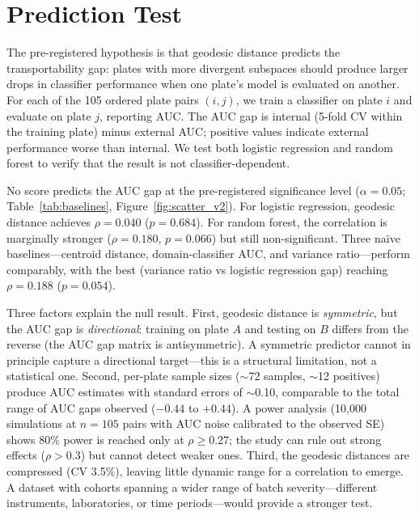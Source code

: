 \documentclass{article}
\begin{document}
\section{Prediction Test}
\label{sec:prediction}

The pre-registered hypothesis is that geodesic distance predicts the transportability gap: plates with more divergent subspaces should produce larger drops in classifier performance when one plate's model is evaluated on another. For each of the 105 ordered plate pairs $(i, j)$, we train a classifier on plate $i$ and evaluate on plate $j$, reporting AUC. The AUC gap is internal (5-fold CV within the training plate) minus external AUC; positive values indicate external performance worse than internal. We test both logistic regression and random forest to verify that the result is not classifier-dependent.

No score predicts the AUC gap at the pre-registered significance level ($\alpha = 0.05$; Table~\ref{tab:baselines}, Figure~\ref{fig:scatter_v2}). For logistic regression, geodesic distance achieves $\rho = 0.040$ ($p = 0.684$). For random forest, the correlation is marginally stronger ($\rho = 0.180$, $p = 0.066$) but still non-significant. Three na\"{i}ve baselines---centroid distance, domain-classifier AUC, and variance ratio---perform comparably, with the best (variance ratio vs logistic regression gap) reaching $\rho = 0.188$ ($p = 0.054$).

Three factors explain the null result. First, geodesic distance is \emph{symmetric}, but the AUC gap is \emph{directional}: training on plate $A$ and testing on $B$ differs from the reverse (the AUC gap matrix is antisymmetric). A symmetric predictor cannot in principle capture a directional target---this is a structural limitation, not a statistical one. Second, per-plate sample sizes ($\sim$72 samples, $\sim$12 positives) produce AUC estimates with standard errors of $\sim$0.10, comparable to the total range of AUC gaps observed ($-0.44$ to $+0.44$). A power analysis (10{,}000 simulations at $n = 105$ pairs with AUC noise calibrated to the observed SE) shows 80\% power is reached only at $\rho \geq 0.27$; the study can rule out strong effects ($\rho > 0.3$) but cannot detect weaker ones. Third, the geodesic distances are compressed (CV 3.5\%), leaving little dynamic range for a correlation to emerge. A dataset with cohorts spanning a wider range of batch severity---different instruments, laboratories, or time periods---would provide a stronger test.
\end{document}
